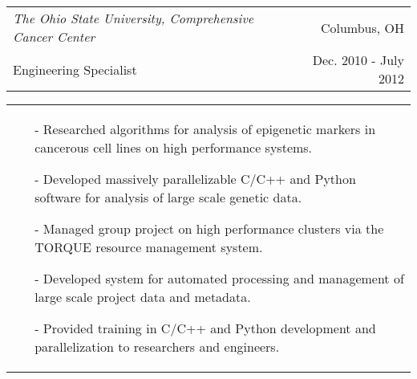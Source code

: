 \begin{tabularx}{\textwidth}{ L R }
  \textit{The Ohio State University, Comprehensive Cancer Center} & Columbus, OH \\
  Engineering Specialist & Dec. 2010 - July 2012 \\
\end{tabularx}
\begin{tabularx}{\textwidth}{ X }
  \begin{small}
  \begin{itemize}
    \itemsep{}
    \item[-] Researched algorithms for analysis of epigenetic markers in cancerous cell lines on high performance systems.
    \item[-] Developed massively parallelizable C/C++ and Python software for analysis of large scale genetic data.
    \item[-] Managed group project on high performance clusters via the TORQUE resource management system.
    \item[-] Developed system for automated processing and management of large scale project data and metadata.
    \item[-] Provided training in C/C++ and Python development and parallelization to researchers and engineers.
  \end{itemize}
  \end{small}
\end{tabularx}
